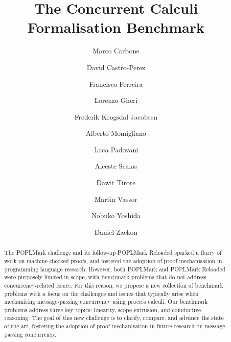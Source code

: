 \documentclass[runningheads]{llncs}
\begin{document}
\title{The Concurrent Calculi Formalisation Benchmark}

\author{
     Marco Carbone 
\and David Castro-Perez 
\and Francisco Ferreira 
\and Lorenzo Gheri 
\and Frederik Krogsdal Jacobsen 
\and Alberto Momigliano 
\and Luca Padovani 
\and Alceste Scalas 
\and Dawit Tirore 
\and Martin Vassor 
\and Nobuko Yoshida 
\and Daniel Zackon 
}



\maketitle

\begin{abstract}
  The POPLMark challenge and its follow-up POPLMark Re\-loaded sparked a flurry of
  work on machine-checked proofs, and fostered the adoption of proof
  mechanisation in programming language research. However, both POPLMark and
  POPLMark Reloaded were purposely limited in scope, with benchmark problems
  that do not address concurrency-related issues.
  For this reason, we propose a new collection of benchmark problems with a
  focus on the challenges and issues that typically arise when mechanising
  message-passing concurrency using process calculi.  Our benchmark problems
  address three key topics: linearity, scope extrusion, and coinductive
  reasoning.  The goal of this new challenge is to clarify, compare, and advance
  the state of the art, fostering the adoption of proof mechanisation in future
  research on message-passing concurrency.

\end{abstract}
\end{document}
